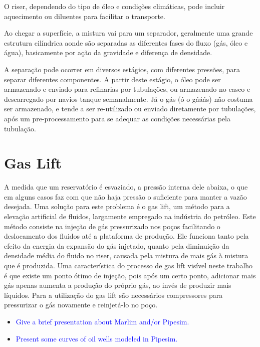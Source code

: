 O riser, dependendo do tipo de óleo e condições climáticas, pode incluir aquecimento ou diluentes para facilitar o transporte.
%


Ao chegar a superfície, a mistura vai para um separador, geralmente uma grande estrutura cilíndrica aonde são separadas as diferentes fases do fluxo (gás, óleo e água), basicamente por ação da gravidade e diferença de densidade.
%


A separação pode ocorrer em diversos estágios, com diferentes pressões, para separar diferentes componentes.
%
A partir deste estágio, o óleo pode ser armazenado e enviado para refinarias por tubulações, ou armazenado no casco e descarregado por navios tanque semanalmente.
%
Já o gás (ó o gááás) não costuma ser armazenado, e tende a ser re-utilizado ou enviado diretamente por tubulações, após um pre-processamento para se adequar as condições necessárias pela tubulação.
%
 

\section{Gas Lift}

A medida que um reservatório é esvaziado, a pressão interna dele abaixa, o que em alguns casos faz com que não haja pressão o suficiente para manter a vazão desejada.
%
Uma solução para este problema é o gas lift, um método para a elevação artificial de fluidos, largamente empregado na indústria do petróleo.
%
Este método consiste na injeção de gás pressurizado nos poços facilitando o deslocamento dos fluidos até a plataforma de produção. 
%
Ele funciona tanto pela efeito da energia da expansão do gás injetado, quanto pela diminuição da densidade média do fluido no riser, causada pela mistura de mais gás à mistura que é produzida.
%
Uma característica do processo de gas lift visível neste trabalho é que existe um ponto ótimo de injeção, pois após um certo ponto, adicionar mais gás apenas aumenta a produção do próprio gás, ao invés de produzir mais líquidos.
%
Para a utilização do gas lift são necessários compressores para pressurizar o gás novamente e reinjetá-lo no poço.





\begin{itemize}

\item \textcolor{blue}{Give a brief presentation about Marlim and/or Pipesim.}

\item \textcolor{blue}{Present some curves of oil wells modeled in Pipesim.}


\end{itemize}
